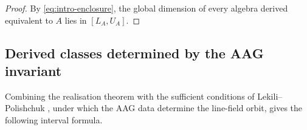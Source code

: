 \documentclass[11pt]{amsart}
\theoremstyle{definition}
\theoremstyle{plain}
\newtheorem{corollary}[corollary]{Corollary}
\theoremstyle{definition}
\theoremstyle{definition}
\newcommand{\Db}{\mathrm D^{\mathrm b}}
\newcommand{\Kb}{\mathrm K^{\mathrm b}}
\newcommand{\modu}{\operatorname{mod}}
\newcommand{\proj}{\operatorname{proj}}
\newcommand{\thick}{\operatorname{thick}}
\newcommand{\gldim}{\operatorname{gl.dim}}
\begin{document}
\begin{proof}
By \eqref{eq:intro-enclosure}, the global dimension of every algebra derived
equivalent to $A$ lies in $[L_A,U_A]$.
\end{proof}



\subsection{Derived classes determined by the AAG invariant}

Combining the realisation theorem with the sufficient conditions of
Lekili--Polishchuk \cite[Corollaries~3.14 and~3.16]{LekiliPolishchuk}, under which the
AAG data determine the line-field orbit, gives the following interval
formula.
\end{document}
